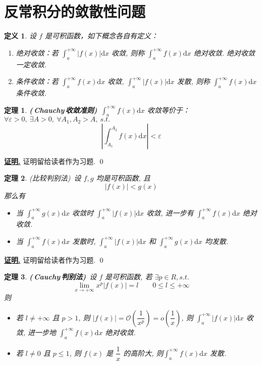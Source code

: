 \documentclass[10pt,a4paper]{book}
\theoremstyle{thmstyle} %
\newtheorem{theorem}{定理}[chapter]
\theoremstyle{defstyle} %
\newtheorem{definition}{定义}[chapter]
\theoremstyle{prostyle} %
\renewenvironment{proof}[1][证明]{\par{\kaishu \uline{\textbf{#1.}}} \;\fangsong}{\qed\par}
\begin{document}
	\section{反常积分的敛散性问题}
	\begin{definition}
		设 $f$ 是可积函数，如下概念各自有定义：
		\begin{enumerate}
			\item 绝对收敛：若 $\displaystyle\int_{a}^{+\infty}|f(x)|\mathrm{d}x$ 收敛, 则称 $\displaystyle\int_{a}^{+\infty}f(x)\mathrm{d}x$ 绝对收敛. 绝对收敛一定收敛.
			\item 条件收敛：若 $\displaystyle\int_{a}^{+\infty}f(x)\mathrm{d}x$ 收敛, $\displaystyle\int_{a}^{+\infty}|f(x)|\mathrm{d}x$ 发散, 则称 $\displaystyle\int_{a}^{+\infty}f(x)\mathrm{d}x$ 条件收敛.
		\end{enumerate}
		
	\end{definition}
	\begin{theorem}
		\textbf{(\,Chauchy\,收敛准则)}\ $\displaystyle{\int_a^{+\infty}{f\left( x \right) \mathrm{d}x}}$ 收敛等价于：$\forall \varepsilon>0,\ \exists A>0,\ \forall A_1,A_2>A,\ s.t.$
		$$
		\displaystyle\left|\int_{A_1}^{A_2}f(x)\mathrm{d}x\right|<\varepsilon
		$$
	\end{theorem}
	\begin{proof}
		证明留给读者作为习题.
	\end{proof}
	\begin{theorem}
		(比较判别法)\ 设 $f,g$ 均是可积函数, 且
		$$
		|f(x)|<g(x)
		$$
		那么有\begin{itemize}
			\item 当 $\displaystyle\int_{a}^{+\infty}g(x)\mathrm{d}x$ 收敛时 $\displaystyle\int_{a}^{+\infty}|f(x)|\mathrm{d}x$ 收敛, 进一步有 $\displaystyle\int_{a}^{+\infty}f(x)\mathrm{d}x$ 绝对收敛.
			\item 当 $\displaystyle\int_{a}^{+\infty}f(x)\mathrm{d}x$ 发散时, $\displaystyle\int_{a}^{+\infty}|f(x)|\mathrm{d}x$ 和 $\displaystyle\int_{a}^{+\infty}g(x)\mathrm{d}x$ 均发散.
		\end{itemize}
	\end{theorem}
	\begin{proof}
		证明留给读者作为习题.
	\end{proof}
	\begin{theorem}
		\textbf{(\,Cauchy\,判别法)}\ 设 $f$ 是可积函数, 若 $\exists p\in R, s.t.$
		$$
		\lim\limits_{x\rightarrow+\infty}x^p|f(x)|=l\quad\quad 0\leqslant l \leqslant+\infty
		$$
		则
		\begin{itemize}
			\item 若 $l\ne+\infty$ 且 $p>1$, 则 $|f(x)|=\mathcal{O}\left(\dfrac{1}{x^p}\right)=o\left(\dfrac{1}{x}\right)$, 则 $\displaystyle\int_{a}^{+\infty}|f(x)|\mathrm{d}x$ 收敛, 进一步地 $\displaystyle\int_{a}^{+\infty}f(x)\mathrm{d}x$ 绝对收敛.
			\item 若 $l\ne0$ 且 $p\leqslant 1$, 则 $f(x)$ 是 $\dfrac{1}{x}$ 的高阶大, 则$\displaystyle\int_{a}^{+\infty}f(x)\mathrm{d}x$ 发散.
		\end{itemize}
	\end{theorem}
\end{document}
